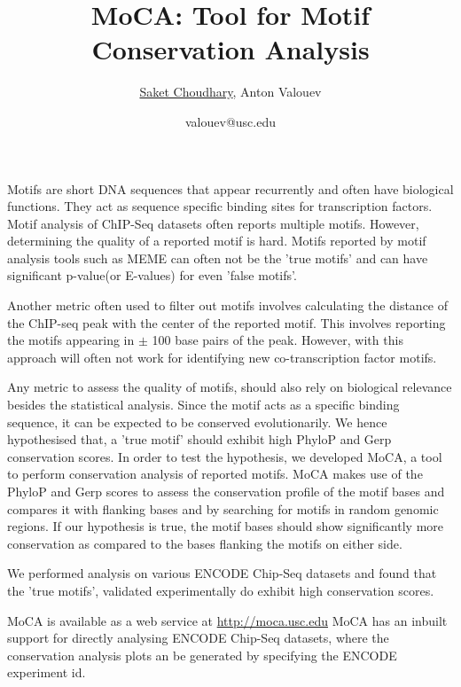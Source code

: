 \documentclass[16pt,a4paper]{article}
\title{\textbf{MoCA: Tool for Motif Conservation Analysis}}
\author{\underline{Saket Choudhary}, Anton Valouev}
\date{valouev@usc.edu}
\begin{document}
\maketitle
Motifs are short DNA sequences that appear recurrently and often have biological functions. They act as sequence specific binding sites for transcription factors. Motif analysis of ChIP-Seq datasets often reports multiple motifs. However, determining the quality of a reported motif is hard. Motifs reported by motif analysis tools such as MEME\cite{bailey2015meme} can often not be the 'true motifs' and  can have significant p-value(or E-values) for even 'false motifs'. 


Another metric often used to filter out motifs involves calculating the distance of the ChIP-seq peak with the center of the reported motif. This involves reporting the motifs appearing in $\pm$ 100 base pairs of the peak. 
However, with this approach will often not work for
identifying new co-transcription factor motifs.


Any metric to assess the quality of motifs, should also rely on biological relevance besides the statistical analysis. 
Since the motif acts as a specific binding sequence, it can be expected to be conserved evolutionarily. We hence hypothesised that, a 'true motif' should exhibit high PhyloP\cite{siepel2006new} and Gerp\cite{davydov2010identifying} conservation scores.
In order to test the hypothesis, we developed MoCA, a tool to perform conservation analysis of reported motifs. MoCA makes use of the PhyloP and Gerp scores to assess the conservation profile of the motif bases and compares it with flanking bases and by searching for motifs in random genomic regions. If our hypothesis is true, the motif bases should show significantly more conservation as compared to the bases flanking the motifs on either side. 

We performed analysis on various ENCODE Chip-Seq datasets and found that the 'true motifs', validated experimentally do exhibit high conservation scores.

MoCA is available as a web service at \url{http://moca.usc.edu}
MoCA has an inbuilt support for directly analysing ENCODE Chip-Seq datasets, where the conservation analysis plots an be generated by specifying the ENCODE experiment id. 


\end{document}
